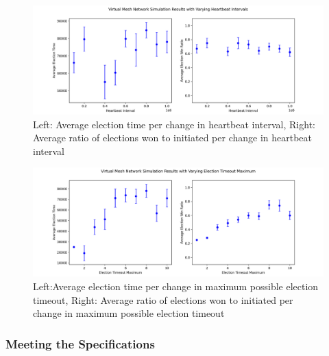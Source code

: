 \begin{figure}[H]
    \centering
    \includegraphics[width=0.9\columnwidth]{images/virtual_vary_heartbeat.png}
    \caption{Left: Average election time per change in heartbeat interval, Right: Average ratio of elections won to initiated per change in heartbeat interval}
    \label{fig:virtual_vary_heartbeat}
\end{figure}


\begin{figure}[H]
    \centering
    \includegraphics[width=0.9\columnwidth]{images/virtual_vary_election_timeout.png}
    \caption{Left:Average election time per change in maximum possible election timeout, Right: Average ratio of elections won to initiated per change in maximum possible election timeout}
    \label{fig:virtual_vary_election_timeout}
\end{figure}


\subsubsection{Meeting the Specifications}

